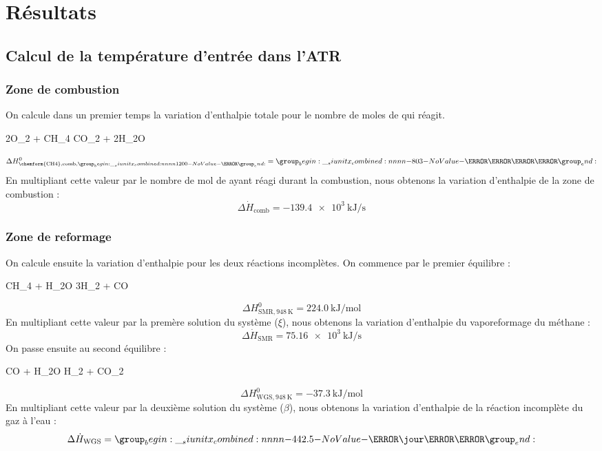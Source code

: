 \documentclass[french, a4paper, 10pt]{article}
\begin{document}
\section{Résultats}
\subsection{Calcul de la température d'entrée dans l'ATR}
\subsubsection*{Zone de combustion}
On calcule dans un premier temps la variation d'enthalpie totale pour le nombre de moles de  qui réagit.
\begin{chemmath}
	2O_2 + CH_4 \longrightarrow CO_2 + 2H_2O
\end{chemmath}
\begin{equation*}\Delta H^0_{\text{\chemform{CH4},comb},\SI{1200}{\kelvin}} = \SI{-803}{\kilo\joule\per\mol}\end{equation*}
En multipliant cette valeur par le nombre de mol de  ayant réagi durant la combustion, nous obtenons la variation d'enthalpie de la zone de combustion :
\begin{equation}\Delta\dot{H}_\text{comb} = \SI{-139.4e3}{\kilo\joule\per\second}\end{equation}

\subsubsection*{Zone de reformage}
On calcule ensuite la variation d'enthalpie pour les deux réactions incomplètes. On commence par le premier équilibre :
\begin{chemmath}
	CH_4 + H_2O \rightleftharpoons 3H_2 + CO
\end{chemmath}
\begin{equation*}\Delta H^0_{\text{SMR},\SI{948}{\kelvin}} = \SI{224.0}{\kilo\joule\per\mol}\end{equation*}
En multipliant cette valeur par la premère solution du système ($\xi$), nous obtenons la variation d'enthalpie du vaporeformage du méthane :
\begin{equation}\Delta\dot{H}_\text{SMR} = \SI{75.16e3}{\kilo\joule\per\second}\end{equation}
On passe ensuite au second équilibre :
\begin{chemmath}
	CO + H_2O \rightleftharpoons H_2 + CO_2
\end{chemmath}
\begin{equation*}\Delta H^0_{\text{WGS},\SI{948}{\kelvin}} = \SI{-37.3}{\kilo\joule\per\mol}\end{equation*}
En multipliant cette valeur par la deuxième solution du système ($\beta$), nous obtenons la variation d'enthalpie de la réaction incomplète du gaz à l'eau : 
\begin{equation}\Delta\dot{H}_\text{WGS} = \SI{-442.5}{\kilo\jour\per\second}\end{equation}
\end{document}
